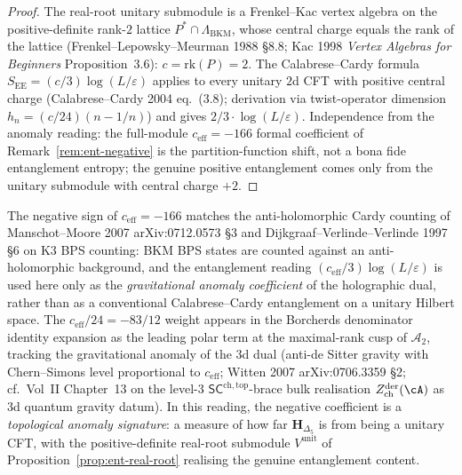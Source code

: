 \begin{proof}
The real-root unitary submodule is a Frenkel--Kac vertex algebra
on the positive-definite rank-$2$ lattice $P^* \cap
\Lambda_{\mathrm{BKM}}$, whose central charge equals the rank of
the lattice (Frenkel--Lepowsky--Meurman 1988 \S 8.8; Kac 1998
\emph{Vertex Algebras for Beginners} Proposition~3.6):
$c = \mathrm{rk}(P) = 2$. The Calabrese--Cardy formula
$S_{\mathrm{EE}} = (c/3)\log(L/\varepsilon)$ applies to every
unitary $2$d CFT with positive central charge
(Calabrese--Cardy 2004 eq.~(3.8); derivation via twist-operator
dimension $h_n = (c/24)(n - 1/n)$) and gives $2/3\cdot\log(L/\varepsilon)$.
Independence from the anomaly reading: the full-module
$c_{\mathrm{eff}} = -166$ formal coefficient of
Remark~\ref{rem:ent-negative} is the partition-function
shift, not a bona fide entanglement entropy; the genuine positive
entanglement comes only from the unitary submodule with central
charge $+2$.
\end{proof}

\begin{remark}
\label{rem:ent-topological-anomaly}
The negative sign of $c_{\mathrm{eff}} = -166$ matches the
anti-holomorphic Cardy counting of
Manschot--Moore 2007 arXiv:0712.0573 \S 3 and
Dijkgraaf--Verlinde--Verlinde 1997 \S 6 on K3 BPS counting: BKM
BPS states are counted against an anti-holomorphic background,
and the entanglement reading $(c_{\mathrm{eff}}/3)\log(L/\varepsilon)$
is used here only as the \emph{gravitational anomaly coefficient} of
the holographic dual, rather than as a conventional Calabrese--Cardy
entanglement on a unitary Hilbert space. The
$c_{\mathrm{eff}}/24 = -83/12$ weight appears in the Borcherds
denominator identity expansion as the leading polar term at the
maximal-rank cusp of $\mathcal A_2$, tracking the gravitational
anomaly of the 3d dual (anti-de Sitter gravity with
Chern--Simons level proportional to $c_{\mathrm{eff}}$; Witten
2007 arXiv:0706.3359 \S 2; cf.\ Vol~II Chapter~13 on the level-$3$
$\mathsf{SC}^{\mathrm{ch,top}}$-brace bulk realisation
$Z^{\mathrm{der}}_{\mathrm{ch}}(\cA)$ as 3d quantum gravity datum). In
this
reading, the negative coefficient is a \emph{topological anomaly
signature}: a measure of how far $\mathbf H_{\Delta_5}$
is from being a unitary CFT, with the positive-definite
real-root submodule $V^{\mathrm{unit}}$ of
Proposition~\ref{prop:ent-real-root} realising the
genuine entanglement content.
\end{remark}

